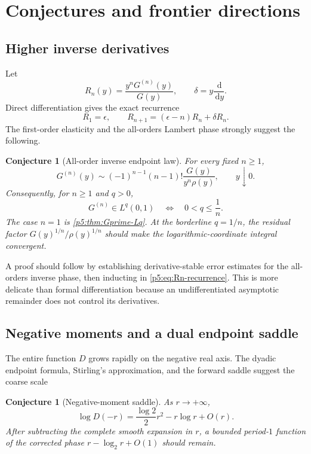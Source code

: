 \documentclass[11pt,oneside]{article}
\newtheorem{conjecture}[theorem]{Conjecture}
\theoremstyle{definition}
\theoremstyle{remark}
\newcommand{\dd}{\,\mathrm d}
\newcommand{\1}{\mathbf 1}
\begin{document}
\section{Conjectures and frontier directions}

\subsection{Higher inverse derivatives}

Let
\begin{equation}
 R_n(y)=\frac{y^nG^{(n)}(y)}{G(y)},
 \qquad \delta=y\frac{\dd}{\dd y}.
\end{equation}
Direct differentiation gives the exact recurrence
\begin{equation}\label{p5:eq:Rn-recurrence}
 R_1=\epsilon,
 \qquad
 R_{n+1}=(\epsilon-n)R_n+\delta R_n.
\end{equation}
The first-order elasticity and the all-orders Lambert phase strongly suggest the following.

\begin{conjecture}[All-order inverse endpoint law]\label{p5:conj:inverse-derivatives}
For every fixed $n\ge1$,
\begin{equation}\label{p5:eq:inverse-derivative-conjecture}
 G^{(n)}(y)\sim(-1)^{n-1}(n-1)!
 \frac{G(y)}{y^n\rho(y)},
 \qquad y\downarrow0.
\end{equation}
Consequently, for $n\ge1$ and $q>0$,
\begin{equation}\label{p5:eq:higher-inverse-Lq-conjecture}
 G^{(n)}\in L^q(0,1)
 \quad\Longleftrightarrow\quad 0<q\le\frac1n.
\end{equation}
The case $n=1$ is \cref{p5:thm:Gprime-Lq}.  At the borderline $q=1/n$, the residual factor $G(y)^{1/n}/\rho(y)^{1/n}$ should make the logarithmic-coordinate integral convergent.
\end{conjecture}

A proof should follow by establishing derivative-stable error estimates for the all-orders inverse phase, then inducting in \eqref{p5:eq:Rn-recurrence}.  This is more delicate than formal differentiation because an undifferentiated asymptotic remainder does not control its derivatives.

\subsection{Negative moments and a dual endpoint saddle}

The entire function $D$ grows rapidly on the negative real axis.  The dyadic endpoint formula, Stirling's approximation, and the forward saddle suggest the coarse scale
\begin{conjecture}[Negative-moment saddle]\label{p5:conj:negative-moments}
As $r\to+\infty$,
\begin{equation}\label{p5:eq:negative-moment-conjecture}
 \log D(-r)=\frac{\log2}{2}r^2-r\log r+O(r).
\end{equation}
After subtracting the complete smooth expansion in $r$, a bounded period-$1$ function of the corrected phase
$r-\log_2r+O(1)$ should remain.
\end{conjecture}
\end{document}
